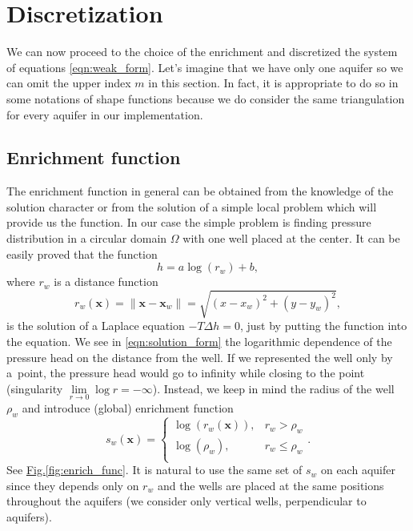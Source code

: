 \documentclass[preprint,12pt]{elsarticle}
\newcommand{\fig}[1]{\hyperref[#1]{Fig.\ref{#1}}}
\def\vc#1{\mathbf{\boldsymbol{#1}}}     %
\newcommand{\bx}{\vc{x}}
\begin{document}
\section{Discretization}
\label{sec:discretization}
We can now proceed to the choice of the enrichment and discretized the system of equations
\eqref{eqn:weak_form}.
Let's imagine that we have only one aquifer so we can omit the upper index $m$ in this section.
In fact, it is appropriate to do so in some notations of shape functions because we do consider the same 
triangulation for every aquifer in our implementation.

\subsection{Enrichment function}
The enrichment function in general can be obtained from the knowledge of the solution character or 
from the solution of a simple local problem which will provide us the function.
In our case the simple problem is finding pressure distribution in a circular domain $\Omega$ with one well 
placed at the center. It can be easily proved that the function
%
\begin{equation} \label{eqn:solution_form}
  h = a \log(r_w)+b, %
\end{equation}
where $r_w$ is a distance function
\begin{equation} \label{eqn:distance}
r_w(\vc{x}) = \|\bx - \vc{x}_w\|= \sqrt{(x-x_w)^2+(y-y_w)^2},
\end{equation}
%
is the solution of a Laplace equation $-T \Delta h = 0$, just by putting the function into the equation. 
%
We see in \eqref{eqn:solution_form} the logarithmic dependence of the pressure head on the distance from 
the well. If we represented the well only by a~point, the pressure head would go to infinity while closing 
to the point (singularity $\lim \limits_{r\rightarrow 0} \log r= -\infty$). Instead, we keep in mind the
radius of the well $\rho_w$ and introduce (global) enrichment function
%
\begin{equation}
\label{eqn:enrich_func}
s_w(\bx) = 
  \begin{cases}
  \log(r_w(\bx)), & r_w > \rho_w\\
  \log(\rho_w), & r_w \le \rho_w\\
  \end{cases}.
\end{equation}
See \fig{fig:enrich_func}.
It is natural to use the same set of $s_w$ on each aquifer since they depends only on $r_w$ and the wells are 
placed at the same positions throughout the aquifers (we consider only vertical wells, perpendicular to aquifers).
%
\end{document}
